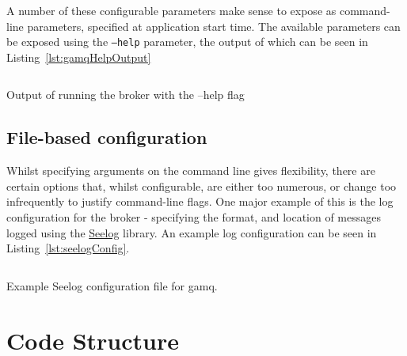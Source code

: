 A number of these configurable parameters make sense to expose as command-line
parameters, specified at application start time. The available parameters can be
exposed using the \texttt{--help} parameter, the output of which can be seen in
Listing~\ref{lst:gamqHelpOutput}

\begin{listing}[ht]
  \centering
  \inputminted{bash}{code/gamqHelpOutput}
  \caption{Output of running the broker with the --help flag}
  \label{lst:gamqHelpOutput}
\end{listing}

\subsection{File-based configuration}
\label{sub:File-based configuration}

Whilst specifying arguments on the command line gives flexibility, there are
certain options that, whilst configurable, are either too numerous, or change
too infrequently to justify command-line flags. One major example of this is the
log configuration for the broker - specifying the format, and location of
messages logged using the \href{https://github.com/cihub/seelog}{Seelog}
library. An example log configuration can be seen in
Listing~\ref{lst:seelogConfig}.

\begin{listing}[ht]
  \centering
  \inputminted{xml}{code/gamq/config/logconfig.xml}
  \caption{Example Seelog configuration file for gamq.}
  \label{lst:seelogConfig}
\end{listing}

\section{Code Structure}
\label{sec:codestructure}

